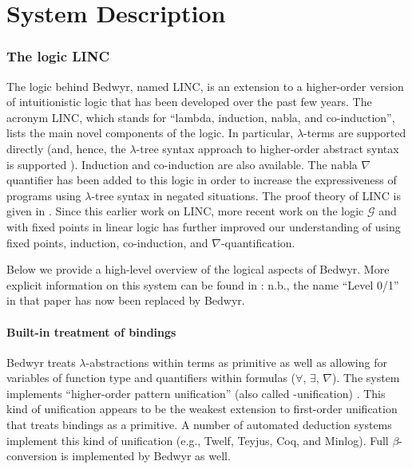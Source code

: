 \part{System Description}


\section{The logic LINC}
\label{logic}

The logic behind Bedwyr, named LINC, is an extension to a higher-order
version of intuitionistic logic that has been developed over the past
few years.  The acronym LINC, which stands for ``lambda, induction,
nabla, and co-induction'', lists the main novel components of the
logic.  In particular, $\lambda$-terms are supported directly (and,
hence, the $\lambda$-tree syntax approach to higher-order abstract
syntax is supported \cite{miller00cl}).  Induction and co-induction
are also available.  The nabla $\nabla$ quantifier has been added to
this logic in order to increase the expressiveness of programs using
$\lambda$-tree syntax in negated situations.  The proof theory of LINC
is given in \cite{miller05tocl,tiu04phd}.  Since this earlier work on
LINC, more recent work on the logic $\mathcal{G}$
\cite{gacek.twolevel,gacek11ic} and with fixed points in linear logic
\cite{baelde08phd,baelde12tocl} has further improved our understanding
of using fixed points, induction, co-induction, and
$\nabla$-quantification.

Below we provide a high-level overview of the logical aspects of Bedwyr.
More explicit information on this system can be found in
\cite{tiu05eshol}: n.b., the name ``Level 0/1'' in that paper has now
been replaced by Bedwyr.

\subsection{Built-in treatment of bindings}

Bedwyr treats $\lambda$-abstractions within terms as primitive as well
as allowing for variables of function type and quantifiers within
formulas ($\forall$, $\exists$, $\nabla$).  The system
implements ``higher-order pattern unification'' (also called
\Ll-unification) \cite{miller91jlc}.   This kind of unification
appears to be the weakest extension to first-order unification that
treats bindings as a primitive.  A number of automated deduction systems
implement this kind of unification (e.g., Twelf, Teyjus, Coq, and
Minlog).  Full $\beta$-conversion is implemented by Bedwyr as well.

